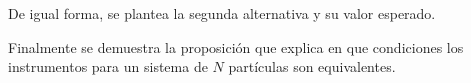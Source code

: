   De igual forma, se plantea la segunda alternativa y su valor esperado. 
  
  Finalmente se demuestra la proposición que explica en que condiciones los instrumentos para un sistema de $N$ partículas son equivalentes.







\begin{comment}

En sistema de $N$ partículas en el que se realiza una medición de un observable de la forma $A_1\tensor A_2\tensor \hdots \tensor A_N$, y en el que ocurre un error en el aparato de medición y confunde los resultados. Con cierta probabilidad se realiza la medición de acuerdo a la permutación $\Pi$ del observable. 

La operación difusa definida en la ecuación ({\ref{eq:operador_difuso2p}}), ahora se pude redefinir para un sistema de $N$ partículas de forma más general como\begin{equation}\label{eq:fm-nparticles}
   \fuzzy{\rho}=\sum_{\Pi_i\in S}p_{i}\permut{i}{\rho}
\end{equation}donde $\mathcal{S}$ es un subconjunto del grupo simétrico de $n$ partículas y $\sum_{i=1}^{N!} p_i=1$.  Los elementos de este grupo simétrico $\mathcal{S}$ pueden escribirse como producto de operaciones de intercambio $S_{ij}$. Si se requiere un número par de operadores de intercambio $S_{ij}$, se dice que la permutación tiene paridad par, de otro modo, se dice que la permutación tiene paridad impar. Algunas de las propiedades destacables de los operadores de permutación es que son unitarios, el operador adjunto tiene la misma paridad y no son hermíticos.

Ahora que se generaliza el operador difuso, puede utilizarse para obtener el valor esperado de esta medición para el sistema de $N$ partículas {\cite{Pineda_2021}}\begin{equation}\label{eq:ExpectedValue-generalForm}\begin{split}
    \left \langle \prodtensor A_i\right \rangle_{\mathcal{F}(\rho)} &=\tr\left(\fuzzy{\rho}\prodtensor A_i\right)\\
    &=\sum_{\Pi_j \in S}p_{j}\tr \left(\permut{j}{\rho} \prodtensor A_i\right).
\end{split}
\end{equation} 

Aunque los operadores del grupo simétrico, en general no son hermíticos, la operación difusa sí lo es y por tanto usando la propiedad cíclica de la traza, el valor esperado de la medición difusa puede escribirse también como \begin{equation}\label{eq:ExpectedValue-generalForm-2}\begin{split}
    \left \langle \prodtensor A_i\right \rangle_{\mathcal{F}(\rho)} &=\sum_{\Pi_j \in S}\tr \left(\fuzzy{\prodtensor A_i}\rho\right).
\end{split}
\end{equation} 




\end{comment}
